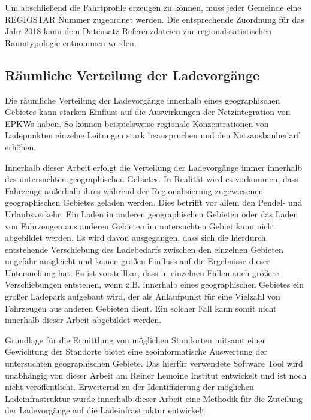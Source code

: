 Um abschließend die Fahrtprofile erzeugen zu können, muss jeder Gemeinde eine \gls{REGIOSTAR} Nummer zugeordnet werden.
Die entsprechende Zuordnung für das Jahr \num{2018} kann dem Datensatz \glqq Referenzdateien zur regionalstatistischen Raumtypologie\grqq{} \cite[][Stand: ]{BMVIa2020} entnommen werden.


\subsection{Räumliche Verteilung der Ladevorgänge}\label{chap:theo_distribution}

Die räumliche Verteilung der Ladevorgänge innerhalb eines geographischen Gebietes kann starken Einfluss auf die Auswirkungen der Netzintegration von \glspl{EPKW} haben.
So können beispielsweise regionale Konzentrationen von Ladepunkten einzelne Leitungen stark beanspruchen und den Netzausbaubedarf erhöhen.\medskip

Innerhalb dieser Arbeit erfolgt die Verteilung der Ladevorgänge immer innerhalb des untersuchten geographischen Gebietes.
In Realität wird es vorkommen, dass Fahrzeuge außerhalb ihres während der Regionalisierung zugewiesenen geographischen Gebietes geladen werden.
Dies betrifft vor allem den Pendel- und Urlaubsverkehr.
Ein Laden in anderen geographischen Gebieten oder das Laden von Fahrzeugen aus anderen Gebieten im untersuchten Gebiet kann nicht abgebildet werden.
Es wird davon ausgegangen, dass sich die hierdurch entstehende Verschiebung des Ladebedarfs zwischen den einzelnen Gebieten ungefähr ausgleicht und keinen großen Einfluss auf die Ergebnisse dieser Untersuchung hat.
Es ist vorstellbar, dass in einzelnen Fällen auch größere Verschiebungen entstehen, wenn z.B. innerhalb eines geographischen Gebietes ein großer Ladepark aufgebaut wird, der als Anlaufpunkt für eine Vielzahl von Fahrzeugen aus anderen Gebieten dient. 
Ein solcher Fall kann somit nicht innerhalb dieser Arbeit abgebildet werden.\medskip

Grundlage für die Ermittlung von möglichen Standorten mitsamt einer Gewichtung der Standorte bietet eine geoinformatische Auswertung der untersuchten geographischen Gebiete.
Das hierfür verwendete Software Tool wird unabhängig von dieser Arbeit am Reiner Lemoine Institut entwickelt und ist noch nicht veröffentlicht.
Erweiternd zu der Identifizierung der möglichen Ladeinfrastruktur wurde innerhalb dieser Arbeit eine Methodik für die Zuteilung der Ladevorgänge auf die Ladeinfrastruktur entwickelt.



